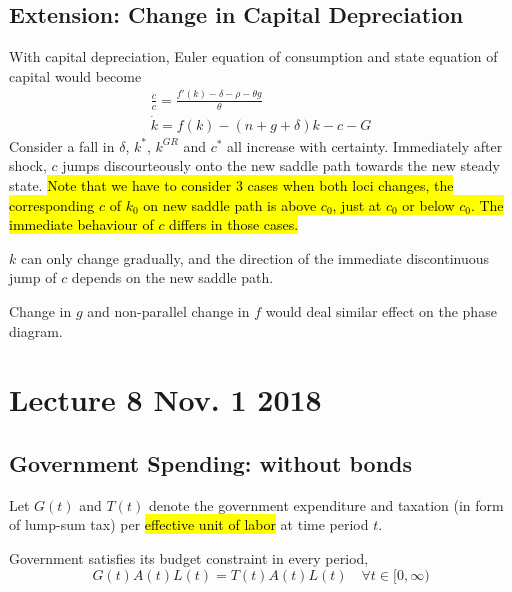 \documentclass[11pt]{article}
\begin{document}
		\subsection{Extension: Change in Capital Depreciation}
			\par With capital depreciation, Euler equation of consumption and state equation of capital would become
			\begin{gather}
				\frac{\dot{c}}{c} = \frac{f'(k)-\delta-\rho-\theta g}{\theta} \\
				\dot{k} = f(k) - (n+g+\delta)k - c - G
			\end{gather}
			Consider a fall in $\delta$, $k^*$, $k^{GR}$ and $c^*$ all increase with certainty. Immediately after shock, $c$ jumps discourteously onto the new saddle path towards the new steady state. \hl{Note that we have to consider 3 cases when both loci changes, the corresponding $c$ of $k_0$ on new saddle path is above $c_0$, just at $c_0$ or below $c_0$. The immediate behaviour of $c$ differs in those cases.}
			\begin{remark}
				$k$ can only change gradually, and the direction of the immediate discontinuous jump of $c$ depends on the new saddle path.
			\end{remark}
			\begin{remark}
				Change in $g$ and non-parallel change in $f$ would deal similar effect on the phase diagram.
			\end{remark}
			
	\newpage
	\section{Lecture 8 Nov. 1 2018}
		\subsection{Government Spending: without bonds}
			\begin{notation}
				Let $G(t)$ and $T(t)$ denote the government expenditure and taxation (in form of lump-sum tax) per \hl{effective unit of labor} at time period $t$.
			\end{notation}
			
			\begin{assumption}
				Government satisfies its budget constraint in every period,
				\begin{equation}
					G(t) A(t) L(t) = T(t) A(t) L(t)\quad \forall t \in [0, \infty)
				\end{equation}
			\end{assumption}
			
\end{document}

